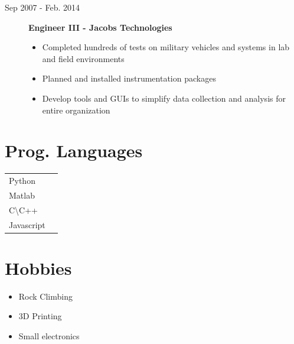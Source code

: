 \documentclass[a4paper,10pt]{article}
\begin{document}
\begin{adjustbox}{valign=t}
\begin{minipage}{0.6\textwidth}
\begin{description}
\item[\normalfont \textcolor{ColorOne}{Sep 2007 - Feb. 2014}] \textbf{Engineer III - Jacobs Technologies}
	\begin{itemize}[align=right, itemindent=-1.5em,leftmargin=0pt]
		\item Completed hundreds of tests on military vehicles and systems in lab and field environments
		\item Planned and installed instrumentation packages
		\item Develop tools and GUIs to simplify data collection and analysis for entire organization
	\end{itemize}
\end{description}

\MySkip

\begin{multicols}{2}
	\section*{Prog. Languages}
	\begin{tabular}{ll}
	Python  			& \SkillBull{$\bullet \bullet \bullet$}\\
	Matlab 		& \SkillBull{$\bullet \bullet \circ$}\\
	C\textbackslash C++        &\SkillBull{$\bullet \bullet \circ$}\\
	Javascript  &\SkillBull{$\bullet \circ \circ$}\\
	\end{tabular}

	\vfill\null \columnbreak  %

	\section*{Hobbies}

	\begin{itemize}[noitemsep]
		\item Rock Climbing
		\item 3D Printing
		\item Small electronics
\end{itemize}
\end{multicols}



\end{minipage}
\end{adjustbox}
\end{document}
